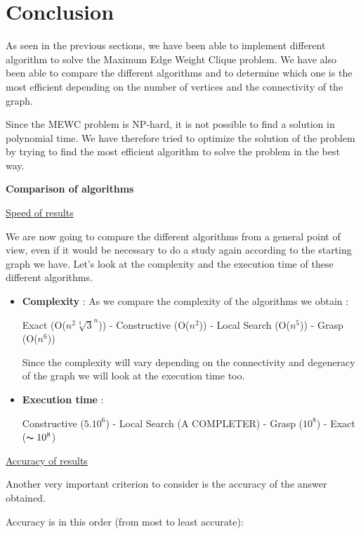 
\section{Conclusion}

As seen in the previous sections, we have been able to implement different
algorithm to solve the Maximum Edge Weight Clique problem. We have also been
able to compare the different algorithms and to determine which one is the most
efficient depending on the number of vertices and the connectivity of the graph.
\bigskip

Since the MEWC problem is NP-hard, it is not possible to find a solution in
polynomial time. We have therefore tried to optimize the solution of the problem
by trying to find the most efficient algorithm to solve the problem in the best
way.
\bigskip

\large\textbf{Comparison of algorithms} \newline 

\underline{Speed of results}\bigskip

We are now going to compare the different algorithms from a general point of view, even if it would be necessary to do a study again according to the starting graph we have.
Let's look at the complexity and the execution time of these different algorithms.

\begin{itemize}
    \item \textbf{Complexity} : As we compare the complexity of the algorithms we obtain : \bigskip
    
Exact (O($n^2\sqrt[3]{3}^n$)) - Constructive (O($n^2$)) - Local Search (O($n^5$)) - Grasp (O($n^6$)) \bigskip
    
    Since the complexity will vary depending on the connectivity and degeneracy of the graph we will look at the execution time too.
    
    \item \textbf{Execution time} : \bigskip
    
Constructive ($5.10^6$) -  Local Search (A COMPLETER) - Grasp ($10^8$) - Exact ($\thicksim 10^8$) 
\end{itemize}
\underline{Accuracy of results}\bigskip 

Another very important criterion to consider is the accuracy of the answer obtained. \bigskip 

Accuracy is in this order (from most to least accurate):

